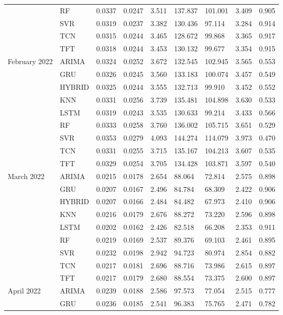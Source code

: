 \begin{tabular}{lllllllll}
 & RF & 0.0337 & 0.0247 & 3.511 & 137.837 & 101.001 & 3.409 & 0.905 \\
 & SVR & 0.0319 & 0.0237 & 3.382 & 130.436 & 97.114 & 3.284 & 0.914 \\
 & TCN & 0.0315 & 0.0244 & 3.465 & 128.672 & 99.868 & 3.365 & 0.917 \\
 & TFT & 0.0318 & 0.0244 & 3.453 & 130.132 & 99.677 & 3.354 & 0.915 \\
February 2022 & ARIMA & 0.0324 & 0.0252 & 3.672 & 132.545 & 102.945 & 3.565 & 0.553 \\
 & GRU & 0.0326 & 0.0245 & 3.560 & 133.183 & 100.074 & 3.457 & 0.549 \\
 & HYBRID & 0.0325 & 0.0244 & 3.555 & 132.713 & 99.910 & 3.452 & 0.552 \\
 & KNN & 0.0331 & 0.0256 & 3.739 & 135.481 & 104.898 & 3.630 & 0.533 \\
 & LSTM & 0.0319 & 0.0243 & 3.535 & 130.633 & 99.214 & 3.433 & 0.566 \\
 & RF & 0.0333 & 0.0258 & 3.760 & 136.002 & 105.715 & 3.651 & 0.529 \\
 & SVR & 0.0353 & 0.0279 & 4.093 & 144.274 & 114.079 & 3.973 & 0.470 \\
 & TCN & 0.0331 & 0.0255 & 3.715 & 135.167 & 104.213 & 3.607 & 0.535 \\
 & TFT & 0.0329 & 0.0254 & 3.705 & 134.428 & 103.871 & 3.597 & 0.540 \\
March 2022 & ARIMA & 0.0215 & 0.0178 & 2.654 & 88.064 & 72.814 & 2.575 & 0.898 \\
 & GRU & 0.0207 & 0.0167 & 2.496 & 84.784 & 68.309 & 2.422 & 0.906 \\
 & HYBRID & 0.0207 & 0.0166 & 2.484 & 84.482 & 67.973 & 2.410 & 0.906 \\
 & KNN & 0.0216 & 0.0179 & 2.676 & 88.272 & 73.220 & 2.596 & 0.898 \\
 & LSTM & 0.0202 & 0.0162 & 2.426 & 82.518 & 66.208 & 2.353 & 0.911 \\
 & RF & 0.0219 & 0.0169 & 2.537 & 89.376 & 69.103 & 2.461 & 0.895 \\
 & SVR & 0.0232 & 0.0198 & 2.942 & 94.723 & 80.974 & 2.854 & 0.882 \\
 & TCN & 0.0217 & 0.0181 & 2.696 & 88.716 & 73.986 & 2.615 & 0.897 \\
 & TFT & 0.0217 & 0.0179 & 2.680 & 88.554 & 73.375 & 2.600 & 0.897 \\
April 2022 & ARIMA & 0.0239 & 0.0188 & 2.586 & 97.573 & 77.054 & 2.515 & 0.777 \\
 & GRU & 0.0236 & 0.0185 & 2.541 & 96.383 & 75.765 & 2.471 & 0.782 \\

\end{tabular}
